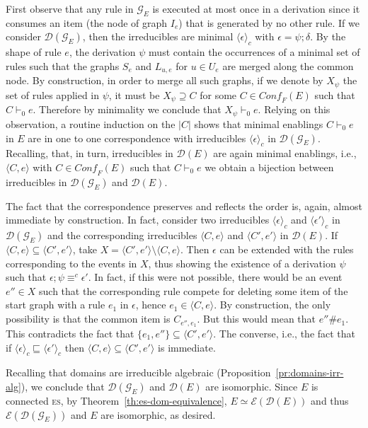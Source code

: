 \documentclass[conference]{IEEEtran}
\renewenvironment{proof}{\begin{IEEEproof}}{\end{IEEEproof}}
\newcommand{\esabbr}{\textsc{es}}
\newcommand{\esir}[2]{\ensuremath{\langle{#1}, {#2}\rangle}}
\newcommand{\zev}[0]{\ensuremath{\mathcal{E}}}
\newcommand{\ev}[1]{\ensuremath{\zev({#1})}}
\newcommand{\conff}[1]{\ensuremath{\mathit{Conf_F}({#1})}}
\newcommand{\zdom}[0]{\ensuremath{\mathcal{D}}}
\newcommand{\dom}[1]{\ensuremath{\zdom({#1})}}
\newcommand{\ltrace}[1]{\ensuremath{\langle {#1}\rangle_c}}
\begin{document}
\begin{proof}
  First observe that any rule in $\mathcal{G}_{E}$ is executed at
  most once in a derivation since it consumes an item (the node of graph
  $I_e$) that is generated by no other rule. If we consider
  $\dom{\mathcal{G}_{E}}$, then the irreducibles are minimal
  $\ltrace{\epsilon}$ with $\epsilon = \psi; \delta$.
  By the shape of rule $e$, the derivation $\psi$ must contain
  the occurrences of a minimal set of rules such that the graphs
  $S_e$ and $L_{u,e}$ for $u \in U_e $ are merged along the common node.
  By construction, in order to merge all such graphs, if we denote by
  $X_\psi$ the set of rules applied in $\psi$, it must be
  $X_\psi \supseteq C$ for some $C \in \conff{E}$ such that
  $C \vdash_0 e$. Therefore by minimality we conclude that
  $X_\psi \vdash_0 e$. Relying on this observation, a routine
  induction on the $|C|$ shows that minimal enablings $C \vdash_0 e$
  in $E$ are in one to one correspondence with irreducibles
  $\ltrace{\epsilon}$ in $\dom{\mathcal{G}_{E}}$. Recalling, that, in
  turn, irreducibles in $\dom{E}$ are again minimal enablings, i.e.,
  $\esir{C}{e}$ with $C \in\conff{E}$ such that $C \vdash_0 e$ we
  obtain a bijection between irreducibles in $\dom{\mathcal{G}_{E}}$
  and $\dom{E}$.
  
  The fact that the correspondence preserves and reflects the order
  is, again, almost immediate by construction. In fact, consider two
  irreducibles $\ltrace{\epsilon}$ and $\ltrace{\epsilon'}$ in
  $\dom{\mathcal{G}_{E}}$ and the corresponding irreducibles
  $\esir{C}{e}$ and $\esir{C'}{e'}$ in $\dom{E}$. If
  $\esir{C}{e} \subseteq \esir{C'}{e'}$, take
  $X = \esir{C'}{e'} \setminus \esir{C}{e}$. Then $\epsilon$ can be
  extended with the rules corresponding to the events in $X$, thus
  showing the existence of a derivation $\psi$ such that
  $\epsilon; \psi \equiv^c \epsilon'$. In fact, if this were not
  possible, there would be an event $e'' \in X$ such that the
  corresponding rule compete for deleting some item of the start graph
  with a rule $e_1$ in $\epsilon$, hence $e_1 \in \esir{C}{e}$. By
  construction, the only possibility is that the common item is
  $C_{e'',e_1}$. But this would mean that $e'' \# e_1$. This
  contradicts the fact that $\{ e_1, e''\} \subseteq \esir{C'}{e'}$.
  The converse, i.e., the fact that if
  $\ltrace{\epsilon} \sqsubseteq \ltrace{\epsilon'}$ then
  $\esir{C}{e} \subseteq \esir{C'}{e'}$ is immediate.


  Recalling that domains are irreducible algebraic
  (Proposition~\ref{pr:domains-irr-alg}), we conclude that
  $\dom{\mathcal{G}_{E}}$ and $\dom{E}$ are isomorphic. 
  Since $E$ is connected {\esabbr}, by
  Theorem~\ref{th:es-dom-equivalence}, $E \simeq \ev{\dom{E}}$ and thus
  $\ev{\dom{\mathcal{G}_{E}}}$ and $E$ are isomorphic, as desired.
\end{proof}
\end{document}
